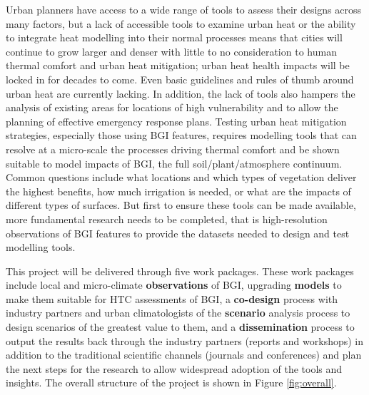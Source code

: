 Urban planners have access to a wide range of tools to assess their designs across many factors, but a lack of accessible tools to examine urban heat or the ability to integrate heat modelling into their normal processes means that cities will continue to grow larger and denser with little to no consideration to human thermal comfort and urban heat mitigation; urban heat health impacts will be locked in for decades to come. Even basic guidelines and rules of thumb around urban heat are currently lacking. In addition, the lack of tools also hampers the analysis of existing areas for locations of high vulnerability and to allow the planning of effective emergency response plans. Testing urban heat mitigation strategies, especially those using BGI features, requires modelling tools that can resolve at a micro-scale the processes driving thermal comfort and be shown suitable to model impacts of BGI, the full soil/plant/atmosphere continuum. Common questions include what locations and which types of vegetation deliver the highest benefits, how much irrigation is needed, or what are the impacts of different types of surfaces. But first to ensure these tools can be made available, more fundamental research needs to be completed, that is high-resolution observations of BGI features to provide the datasets needed to design and test modelling tools. 

This project will be delivered through five work packages. These work packages include local and micro-climate \textbf{observations} of BGI, upgrading \textbf{models} to make them suitable for HTC assessments of BGI, a \textbf{co-design} process with industry partners and urban climatologists of the \textbf{scenario} analysis process to design scenarios of the greatest value to them, and a \textbf{dissemination} process to output the results back through the industry partners (reports and workshops) in addition to the traditional scientific channels (journals and conferences) and plan the next steps for the research to allow widespread adoption of the tools and insights. The overall structure of the project is shown in Figure \ref{fig:overall}.


